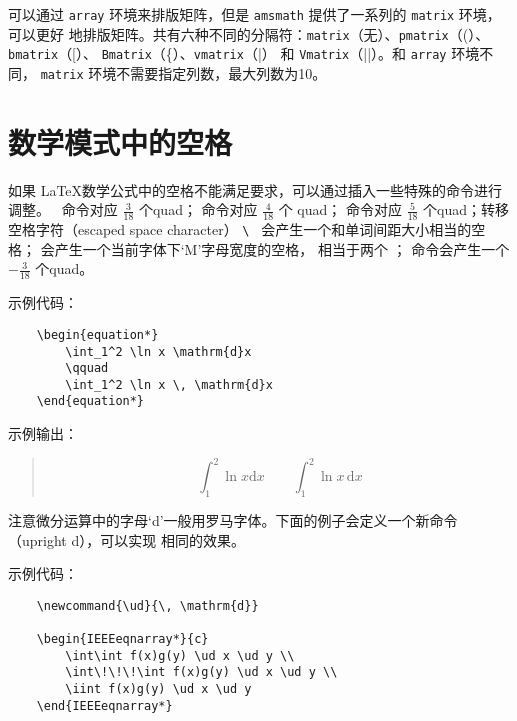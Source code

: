 \documentclass[UTF8]{ctexart}
\begin{document}
可以通过 \texttt{array} 环境来排版矩阵，但是 \texttt{amsmath} 提供了一系列的 \texttt{matrix} 环境，可以更好
地排版矩阵。共有六种不同的分隔符：\texttt{matrix}（无）、\texttt{pmatrix}（(）、\texttt{bmatrix}（[）、
\texttt{Bmatrix}（\{）、\texttt{vmatrix}（|） 和 \texttt{Vmatrix}（||）。和 \texttt{array} 环境不同，
\texttt{matrix} 环境不需要指定列数，最大列数为10。

\section{数学模式中的空格}
如果 \LaTeX 数学公式中的空格不能满足要求，可以通过插入一些特殊的命令进行调整。\texttt{\,} 命令对应
$\frac{3}{18}$ 个quad；\texttt{\:} 命令对应 $\frac{4}{18}$ 个 quad；
\texttt{\;} 命令对应 $\frac{5}{18}$ 个quad；转移空格字符（escaped space character）
\verb*|\ | 会产生一个和单词间距大小相当的空格；\texttt{\quad} 会产生一个当前字体下‘M’字母宽度的空格，
\texttt{\qquad} 相当于两个 \texttt{\quad}；\texttt{\!}
命令会产生一个$-\frac{3}{18}$ 个quad。

示例代码：
\begin{verbatim}
    \begin{equation*}
        \int_1^2 \ln x \mathrm{d}x
        \qquad
        \int_1^2 \ln x \, \mathrm{d}x
    \end{equation*}
\end{verbatim}

示例输出：
\begin{quote}
    \begin{equation*}
        \int_1^2 \ln x \mathrm{d}x
        \qquad
        \int_1^2 \ln x \, \mathrm{d}x
    \end{equation*}
\end{quote}

注意微分运算中的字母‘d’一般用罗马字体。下面的例子会定义一个新命令 \texttt{\ud}（upright d），可以实现
相同的效果。

示例代码：
\begin{verbatim}
    \newcommand{\ud}{\, \mathrm{d}}

    \begin{IEEEeqnarray*}{c}
        \int\int f(x)g(y) \ud x \ud y \\
        \int\!\!\!\int f(x)g(y) \ud x \ud y \\
        \iint f(x)g(y) \ud x \ud y
    \end{IEEEeqnarray*}
\end{verbatim}
\end{document}

